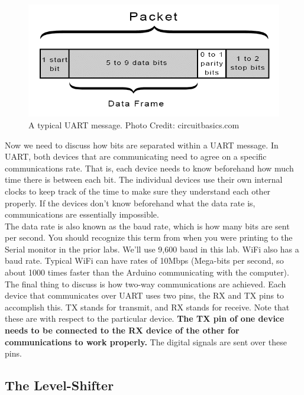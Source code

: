 \documentclass[12pt]{article}
\begin{document}
	\begin{figure}[h]
		\begin{center}
			\includegraphics[scale=1]{Figures/UARTmessage.png}
			\caption{A typical UART message. Photo Credit: circuitbasics.com}
		\end{center}
	\end{figure}
	
	Now we need to discuss how bits are separated within a UART message. In UART, both devices that are communicating need to agree on a specific communications rate. That is, each device needs to know beforehand how much time there is between each bit. The individual devices use their own internal clocks to keep track of the time to make sure they understand each other properly. If the devices don't know beforehand what the data rate is, communications are essentially impossible. \\
	
	The data rate is also known as the baud rate, which is how many bits are sent per second. You should recognize this term from when you were printing to the Serial monitor in the prior labs. We'll use 9,600 baud in this lab. WiFi also has a baud rate.  Typical WiFi can have rates of 10Mbps (Mega-bits per second, so about 1000 times faster than the Arduino communicating with the computer).\\
	
	The final thing to discuss is how two-way communications are achieved. Each device that communicates over UART uses two pins, the RX and TX pins to accomplish this. TX stands for transmit, and RX stands for receive. Note that these are with respect to the particular device. {\bf The TX pin of one device needs to be connected to the RX device of the other for communications to work properly.} The digital signals are sent over these pins.
	
	\newpage
	\subsection*{The Level-Shifter}
	
\end{document}
